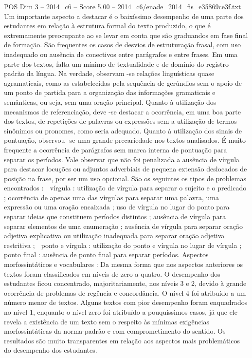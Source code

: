 \begin{textsample}{POS Dim 3 – 2014\_c6 – Score 5.00 – 2014\_c6/enade\_2014\_fis\_e35869ce3f.txt}
Um importante aspecto a destacar é o baixíssimo desempenho de uma parte dos estudantes em relação à estrutura formal do texto produzido, o que é extremamente preocupante ao se levar em conta que são graduandos em fase final de formação.
São frequentes os casos de desvios de estruturação frasal, com uso inadequado ou ausência de conectivos entre parágrafos e entre frases.
Em uma parte dos textos, falta um mínimo de textualidade e de domínio do registro padrão da língua.
Na verdade, observam -se relações linguísticas quase agramaticais, como as estabelecidas pela sequência de gerúndios sem o apoio de um ponto de partida para a organização das informações gramaticais e semânticas, ou seja, sem uma oração principal.
Quanto à utilização dos mecanismos de referenciação, deve -se destacar a ocorrência, em uma boa parte dos textos, de repetições de palavras ou expressões sem a utilização de termos sinônimos ou pronomes, como seria adequado.
Quanto à utilização dos sinais de pontuação, observou -se uma grande precariedade nos textos analisados.
É muito frequente a ocorrência de parágrafos sem marca interna de pontuação para separar os períodos.
Vale observar que não foi penalizada a ausência de vírgula para destacar locuções ou adjuntos adverbiais de pequena extensão deslocados de posição na frase, por ser um uso opcional.
São os seguintes os tipos de problemas encontrados :  vírgula : utilização de vírgula para separar o sujeito e o predicado ; ocorrência de apenas uma das vírgulas para separar uma palavra, uma expressão ou uma oração encaixada ; uso de vírgula no lugar do ponto para separar ideias que constituem períodos distintos ; ausência de vírgula para separar elementos de uma enumeração ; ausência de vírgula para separar oração adjetiva explicativa ou utilização inadequada para separar oração adjetiva restritiva ;  ponto e vírgula : utilização do ponto e vírgula no lugar de vírgula ;  ponto final : ausência de ponto final para separar períodos.
Aspectos morfossintáticos e vocabulares : Da mesma forma que nos aspectos anteriores os textos foram classificados em níveis de zero a quatro.
O desempenho dos estudantes ficou concentrado, majoritariamente, nos níveis 3 e 2, devido à grande ocorrência de problemas de regência e concordância.
O nível 4 foi atribuído a um número menor de textos.
Alguns textos com pior desempenho foram enquadrados no nível 1, enquanto o nível zero foi atribuído a pouquíssimos casos, já que ele revela a existência de um texto sem o respeito às mínimas exigências morfossintáticas da norma-padrão e com comprometimento do sentido.
Os resultados são muito transparentes em relação aos aspectos mais problemáticos do desempenho dos estudantes.

\end{textsample}

